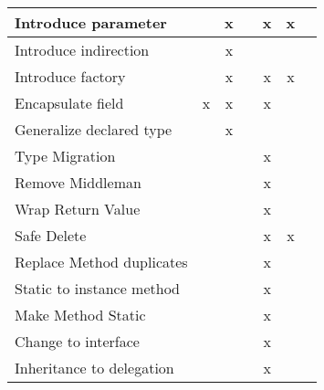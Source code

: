 \begin{table}
\begin{tabular}{|l|c|c|c|c|c|c|}
Introduce parameter       &               & x       &     & x        & x        &          \\ \hline
Introduce indirection     &               & x       &     &          &          &          \\ \hline
Introduce factory         &               & x       &     & x        & x        &          \\ \hline
Encapsulate field         & x             & x       &     & x        &          &          \\ \hline
Generalize declared type  &               & x       &     &          &          &          \\ \hline
Type Migration            &               &         &     & x        &          &          \\ \hline
Remove Middleman          &               &         &     & x        &          &          \\ \hline
Wrap Return Value         &               &         &     & x        &          &          \\ \hline
Safe Delete               &               &         &     & x        & x        &          \\ \hline
Replace Method duplicates &               &         &     & x        &          &          \\ \hline
Static to instance method &               &         &     & x        &          &          \\ \hline
Make Method Static        &               &         &     & x        &          &          \\ \hline
Change to interface 	  &               &         &     & x        &          &          \\ \hline
Inheritance to delegation &               &         &     & x        &          &          \\ \hline
\end{tabular}
\end{table}
 
